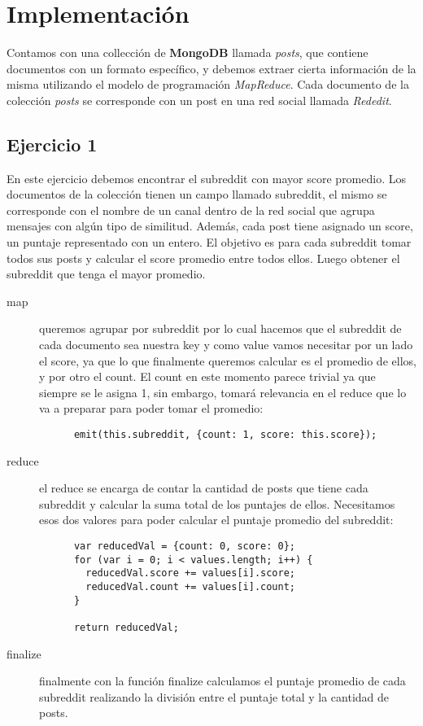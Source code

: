 \section{Implementación}
Contamos con una collección de \textbf{MongoDB} llamada \textit{posts}, que contiene
documentos con un formato específico, y debemos extraer cierta información de la 
misma utilizando el modelo de programación \textit{MapReduce}.
Cada documento de la colección \textit{posts} se corresponde con un post en una red
social llamada \textit{Rededit}.

\subsection{Ejercicio 1}
En este ejercicio debemos encontrar el subreddit con mayor score promedio. Los documentos
de la colección tienen un campo llamado subreddit, el mismo se corresponde con el nombre
de un canal dentro de la red social que agrupa mensajes con algún tipo de similitud. Además,
cada post tiene asignado un score, un puntaje representado con un entero. El objetivo
es para cada subreddit tomar todos sus posts y calcular el score promedio entre todos ellos.
Luego obtener el subreddit que tenga el mayor promedio.
\begin{description}
  \item[map] queremos agrupar por subreddit por lo cual hacemos que el
    subreddit de cada documento sea nuestra key y como value vamos necesitar
    por un lado el score, ya que lo que finalmente queremos calcular es el
    promedio de ellos, y por otro el count. El count en este momento parece
    trivial ya que siempre se le asigna 1, sin embargo, tomará relevancia
    en el reduce que lo va a preparar para poder tomar el promedio:
    \begin{lstlisting}
      emit(this.subreddit, {count: 1, score: this.score});
    \end{lstlisting}
  \item[reduce] el reduce se encarga de contar la cantidad de posts que
    tiene cada subreddit y calcular la suma total de los puntajes de ellos.
    Necesitamos esos dos valores para poder calcular el puntaje promedio del 
    subreddit:
    \begin{lstlisting}
      var reducedVal = {count: 0, score: 0};
      for (var i = 0; i < values.length; i++) {
        reducedVal.score += values[i].score;
        reducedVal.count += values[i].count;
      }

      return reducedVal;
    \end{lstlisting}
  \item[finalize] finalmente con la función finalize calculamos el puntaje 
    promedio de cada subreddit realizando la división entre el puntaje
    total y la cantidad de posts.
\end{description}

